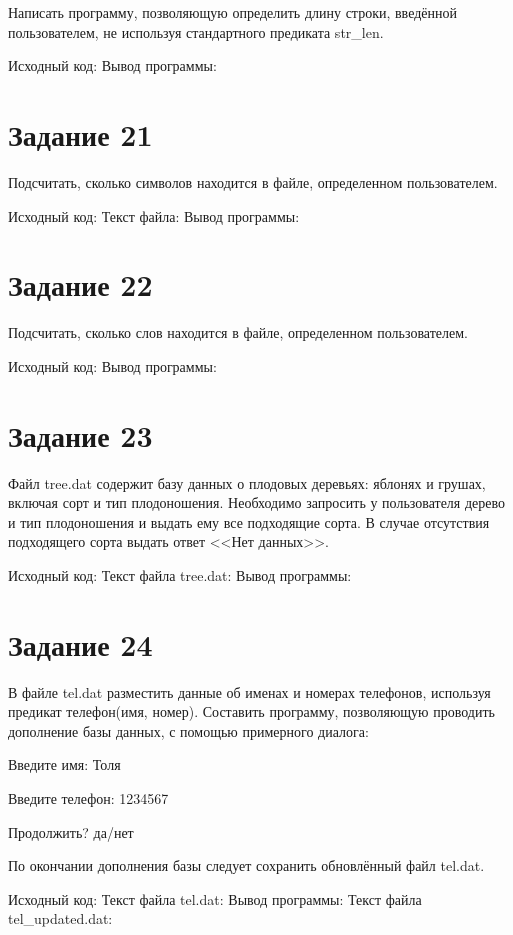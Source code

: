 \documentclass[a4paper,14pt]{article}
\begin{document}
    Написать программу, позволяющую определить длину строки, введённой пользователем, не используя стандартного предиката str\_len.


    Исходный код:
    {\small {}}
    Вывод программы:
    {\small {}}


    \section*{Задание 21}

    Подсчитать, сколько символов находится в файле, определенном пользователем.


    Исходный код:
    {\small {}}
    Текст файла:
    {\small {}}
    Вывод программы:
    {\small {}}


    \section*{Задание 22}

    Подсчитать, сколько слов находится в файле, определенном пользователем.


    Исходный код:
    {\small {}}
    Вывод программы:
    {\small {}}


    \section*{Задание 23}

    Файл tree.dat содержит базу данных о плодовых деревьях: яблонях и грушах, включая сорт и тип плодоношения.
    Необходимо запросить у пользователя дерево и тип плодоношения и выдать ему все подходящие сорта. В случае отсутствия подходящего сорта выдать ответ <<Нет данных>>.


    Исходный код:
    {\small {}}
    Текст файла tree.dat:
    {\small {}}
    Вывод программы:
    {\small {}}


    \section*{Задание 24}

    В файле tel.dat разместить данные об именах и номерах телефонов, используя предикат телефон(имя, номер).
    Составить программу, позволяющую проводить дополнение базы данных, с помощью примерного диалога:

    Введите имя: Толя

    Введите телефон: 1234567

    Продолжить? да/нет

    По окончании дополнения базы следует сохранить обновлённый файл tel.dat.

    Исходный код:
    {\small {}}
    Текст файла tel.dat:
    {\small {}}
    Вывод программы:
    {\small {}}
    Текст файла tel\_updated.dat:
    {\small {}}
\end{document}
